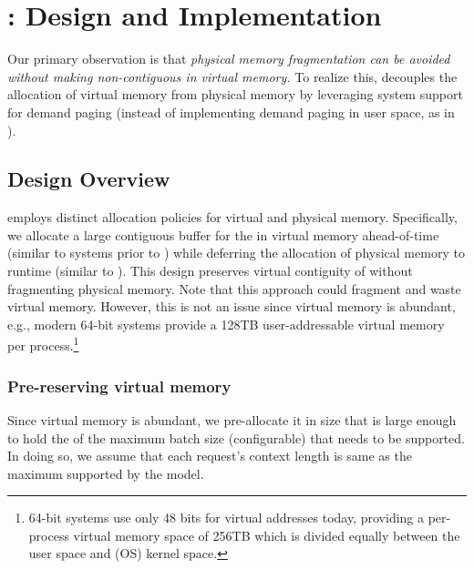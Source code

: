 \section{\sysname: Design and Implementation}
\label{sec:design}

Our primary observation is that \textit{physical memory fragmentation can be avoided without making \kvcache non-contiguous in virtual memory.} To realize this, \sysname decouples the allocation of virtual memory from physical memory by leveraging system support for demand paging (instead of implementing demand paging in user space, as in \pa). 



\subsection{Design Overview}
\label{sec:design:overview}

\sysname employs distinct allocation policies for virtual and physical memory. Specifically, we allocate a large contiguous buffer for the \kvcache in virtual memory ahead-of-time (similar to systems prior to \pa) while deferring the allocation of physical memory to runtime (similar to \pa). This design preserves virtual contiguity of \kvcache without fragmenting physical memory. Note that this approach could fragment and waste virtual memory. However, this is not an issue since virtual memory is abundant, e.g., modern 64-bit systems provide a 128TB user-addressable virtual memory per  process.\footnote{64-bit systems use only 48 bits for virtual addresses today, providing a per-process virtual memory space of 256TB which is divided equally between the user space and (OS) kernel space.}




\subsubsection{Pre-reserving virtual memory}
Since virtual memory is abundant, we pre-allocate it in size that is large enough to hold the \kvcache of the maximum batch size (configurable) that needs to be supported. In doing so, we assume that each request's context length is same as the maximum  supported by the model.

